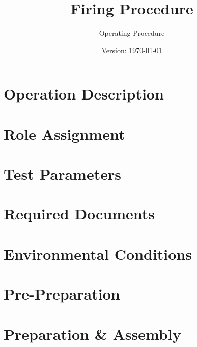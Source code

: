 \documentclass{article}
\title{Firing Procedure}
\author{Operating Procedure}
\date{Version: \isodate\today}
\begin{document}
\maketitle

\thispagestyle{fancy}

\renewcommand{\thesection}{\Alph{section}}

\newtoggle{firing}
\toggletrue{firing}

\section{Operation Description}


\section{Role Assignment}


\section{Test Parameters}


\section{Required Documents}


\section{Environmental Conditions}


\newpage

\renewcommand{\thesection}{\arabic{section}}

\setcounter{section}{0}

\section{Pre-Preparation}


\section{Preparation \& Assembly}

\end{document}
